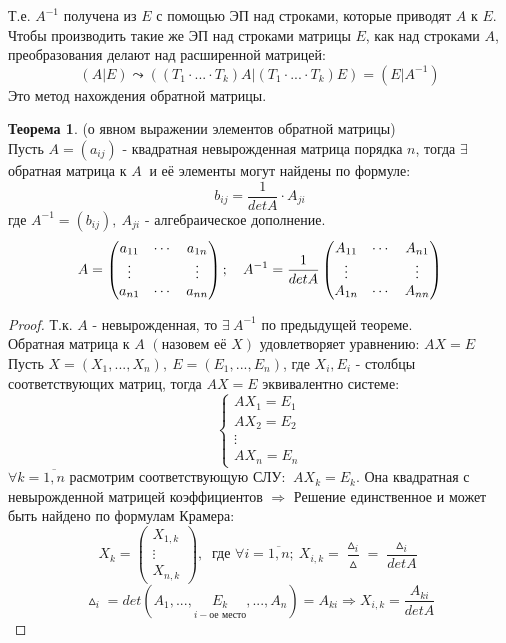 \documentclass[a4paper, 12pt]{article}
\theoremstyle{definition}
\newtheorem*{theorem}{Теорема}
\begin{document}
  Т.е. $A^{-1}$ получена из $E$ с помощью ЭП над строками, которые приводят $A$ к $E$. \\
  Чтобы производить такие же ЭП над строками матрицы $E$, как над строками $A$, преобразования делают над расширенной матрицей:
  $$(A|E) \leadsto ((T_1 \cdot ... \cdot T_k)A | (T_1 \cdot ... \cdot T_k)E) = (E|A^{-1})$$ 
  Это метод нахождения обратной матрицы.
  \begin{theorem}
    (о явном выражении элементов обратной матрицы) \\
    Пусть $A = (a_{ij})$ - квадратная невырожденная матрица порядка $n$, тогда $\exists$ обратная матрица к $A \ $ и её элементы могут найдены по формуле: 
    $$b_{ij} = \frac{1}{detA} \cdot A_{ji}$$
    где $A^{-1} = (b_{ij}), \ A_{ji}$ - алгебраическое дополнение. 
    $$A = \begin{pmatrix}
      a_{11} & \cdots & a_{1n} \\
      \vdots & \null & \vdots \\
      a_{n1} & \cdots & a_{nn} 
    \end{pmatrix}; \ \ \ A^{-1} = \frac{1}{detA} \begin{pmatrix}
      A_{11} & \cdots & A_{n1} \\
      \vdots  & \null & \vdots \\
      A_{1n} &  \cdots & A_{nn} 
    \end{pmatrix}$$    
  \end{theorem} 
  \begin{proof}
    Т.к. $A$ - невырожденная, то $\exists \ A^{-1}$ по предыдущей теореме. \\
    Обратная матрица к $A$ $(\text{назовем её } X)$  удовлетворяет уравнению: $AX=E$ \\
    Пусть $X = (X_1,...,X_n), \ E = (E_1,...,E_n)$, где $X_i, E_i$ - столбцы соответствующих матриц, тогда $AX = E$ эквивалентно системе:
    $$\begin{cases}
      AX_1 = E_1 \\
      AX_2 = E_2 \\
      \vdots \\
      AX_n = E_n
    \end{cases}$$    
    $\forall k = \overline{1,n}$ расмотрим соответствующую СЛУ: $ \ AX_k = E_k $. Она квадратная с невырожденной матрицей коэффициентов $\Longrightarrow $ Решение единственное и может быть найдено по формулам Крамера:
    $$X_k = \begin{pmatrix}
    X_{1,k} \\ \vdots \\ X_{n,k} \end{pmatrix}, \  \text{ где } \forall i = \overline{1,n}; \ X_{i,k} = \frac{\vartriangle_i}{\vartriangle} = \frac{\vartriangle_i}{detA}$$
    $$\vartriangle_i = det(A_1,...,\underset{i- \text{ое место}}{E_k} ,...,A_n) = A_{ki} \Longrightarrow X_{i,k} = \frac{A_{ki}}{detA}$$ 
  \end{proof} 
  
\end{document}
